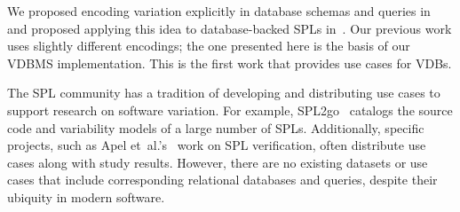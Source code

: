 
We proposed encoding variation explicitly in database schemas and queries
in~\cite{ATW17dbpl} and proposed applying this idea to database-backed SPLs
in~\cite{ATW18poly}. Our previous work uses slightly different encodings; the
one presented here is the basis of our VDBMS implementation.
This is the first work that provides use cases for VDBs.


The SPL community has a tradition of developing and distributing use cases
to support research on software variation. For example, SPL2go~\cite{SPL2go}
catalogs the source code and variability models of a large number of SPLs.
Additionally, specific projects, such as Apel
et~al.'s~\cite{apel2013strategies} work on SPL verification, often distribute
use cases along with study results.
%
However, there are no existing datasets or use cases that include
corresponding relational databases and queries, despite their ubiquity in
modern software.


